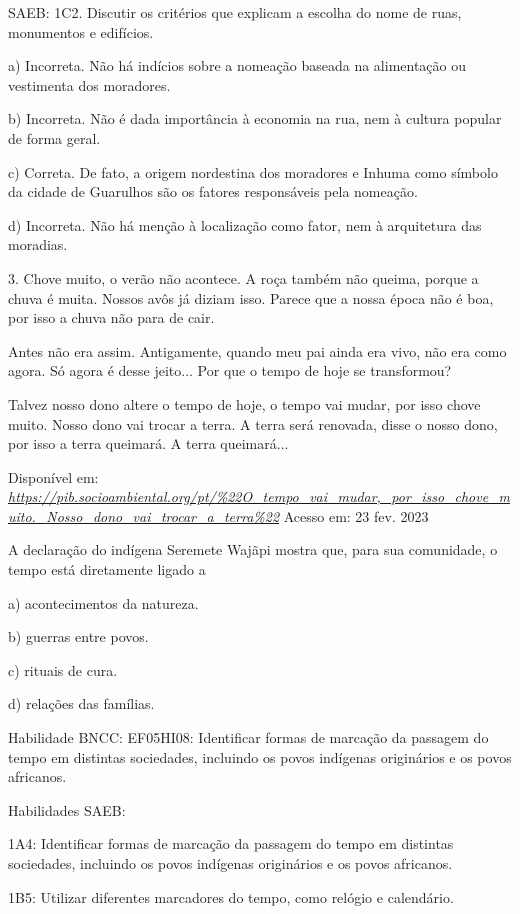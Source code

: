 SAEB: 1C2. Discutir os critérios que explicam a escolha do nome de ruas,
monumentos e edifícios.

a) Incorreta. Não há indícios sobre a nomeação baseada na alimentação ou
vestimenta dos moradores.

b) Incorreta. Não é dada importância à economia na rua, nem à cultura
popular de forma geral.

c) Correta. De fato, a origem nordestina dos moradores e Inhuma como
símbolo da cidade de Guarulhos são os fatores responsáveis pela
nomeação.

d) Incorreta. Não há menção à localização como fator, nem à arquitetura
das moradias.

3. Chove muito, o verão não acontece. A roça também não queima, porque a
chuva é muita. Nossos avôs já diziam isso. Parece que a nossa época não
é boa, por isso a chuva não para de cair.

Antes não era assim. Antigamente, quando meu pai ainda era vivo, não era
como agora. Só agora é desse jeito... Por que o tempo de hoje se
transformou?

Talvez nosso dono altere o tempo de hoje, o tempo vai mudar, por isso
chove muito. Nosso dono vai trocar a terra. A terra será renovada, disse
o nosso dono, por isso a terra queimará. A terra queimará...

Disponível em:
\href{https://pib.socioambiental.org/pt/\%22O_tempo_vai_mudar,_por_isso_chove_muito._Nosso_dono_vai_trocar_a_terra\%22}{\emph{https://pib.socioambiental.org/pt/\%22O\_tempo\_vai\_mudar,\_por\_isso\_chove\_muito.\_Nosso\_dono\_vai\_trocar\_a\_terra\%22}}
Acesso em: 23 fev. 2023

A declaração do indígena Seremete Wajãpi mostra que, para sua
comunidade, o tempo está diretamente ligado a

a) acontecimentos da natureza.

b) guerras entre povos.

c) rituais de cura.

d) relações das famílias.

Habilidade BNCC: EF05HI08: Identificar formas de marcação da passagem do
tempo em distintas sociedades, incluindo os povos indígenas originários
e os povos africanos.

Habilidades SAEB:

1A4: Identificar formas de marcação da passagem do tempo em distintas
sociedades, incluindo os povos indígenas originários e os povos
africanos.

1B5: Utilizar diferentes marcadores do tempo, como relógio e calendário.

